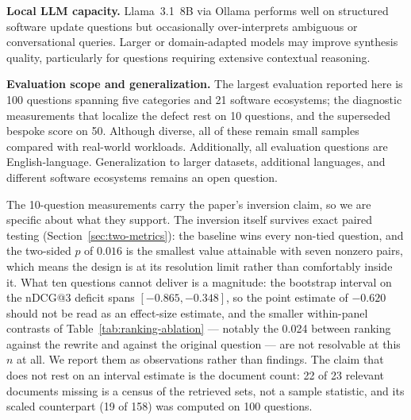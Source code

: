 \documentclass[acmsmall,review,anonymous,screen]{acmart}
\begin{document}
\textbf{Local LLM capacity.}
Llama~3.1~8B via Ollama performs well on structured software update
questions but occasionally over-interprets ambiguous or conversational
queries. Larger or domain-adapted models may improve synthesis quality,
particularly for questions requiring extensive contextual reasoning.

\textbf{Evaluation scope and generalization.}
The largest evaluation reported here is 100 questions spanning five categories
and 21 software ecosystems; the diagnostic measurements that localize the defect
rest on 10 questions, and the superseded bespoke score on 50. Although diverse,
all of these remain small samples compared with real-world workloads. Additionally, all evaluation
questions are English-language. Generalization to larger datasets,
additional languages, and different software ecosystems remains an
open question.

The 10-question measurements carry the paper's inversion claim, so we are
specific about what they support. The inversion itself survives exact paired
testing (Section~\ref{sec:two-metrics}): the baseline wins every non-tied
question, and the two-sided $p$ of $0.016$ is the smallest value attainable
with seven nonzero pairs, which means the design is at its resolution limit
rather than comfortably inside it. What ten questions cannot deliver is a
magnitude: the bootstrap interval on the nDCG@3 deficit spans $[-0.865,
-0.348]$, so the point estimate of $-0.620$ should not be read as an
effect-size estimate, and the smaller within-panel contrasts of
Table~\ref{tab:ranking-ablation} --- notably the 0.024 between ranking against
the rewrite and against the original question --- are not resolvable at this
$n$ at all. We report them as observations rather than findings. The claim that
does not rest on an interval estimate is the document count: 22 of 23 relevant
documents missing is a census of the retrieved sets, not a sample statistic,
and its scaled counterpart (19 of 158) was computed on 100 questions.
\end{document}
